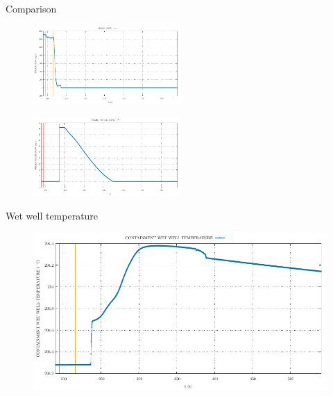 \begin{frame}{Comparison}
	\begin{figure}
		\centering
		\includegraphics[width=0.5\textwidth]{./graphs/STEAM FLOW_comp.pdf}
		
	\end{figure}
	\begin{figure}
		\centering
		\includegraphics[width=0.5\textwidth]{./graphs/RELIEF SYSTEM FLOW_comp.pdf}
		
	\end{figure}
	
\end{frame}
\begin{frame}{Wet well temperature}
	\begin{figure}
		\centering
		\includegraphics[width=\textwidth]{./graphs/CONTAINMENT WET WELL TEMPERATURE_comp.pdf}
		
	\end{figure}
	
\end{frame}
